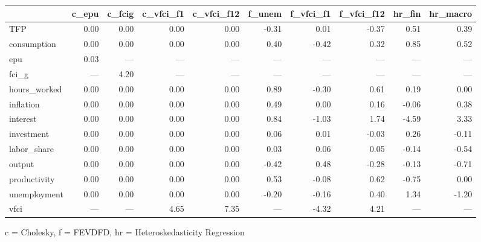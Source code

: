 
\fontsize{12.0pt}{14.4pt}\selectfont
\begin{tabular*}{\linewidth}{@{\extracolsep{\fill}}l|rrrrrrrrr}
\toprule
 & c\_epu & c\_fcig & c\_vfci\_f1 & c\_vfci\_f12 & f\_unem & f\_vfci\_f1 & f\_vfci\_f12 & hr\_fin & hr\_macro \\ 
\midrule\addlinespace[2.5pt]
TFP & 0.00 & 0.00 & 0.00 & 0.00 & -0.31 & 0.01 & -0.37 & 0.51 & 0.39 \\ 
consumption & 0.00 & 0.00 & 0.00 & 0.00 & 0.40 & -0.42 & 0.32 & 0.85 & 0.52 \\ 
epu & 0.03 & — & — & — & — & — & — & — & — \\ 
fci\_g & — & 4.20 & — & — & — & — & — & — & — \\ 
hours\_worked & 0.00 & 0.00 & 0.00 & 0.00 & 0.89 & -0.30 & 0.61 & 0.19 & 0.00 \\ 
inflation & 0.00 & 0.00 & 0.00 & 0.00 & 0.49 & 0.00 & 0.16 & -0.06 & 0.38 \\ 
interest & 0.00 & 0.00 & 0.00 & 0.00 & 0.84 & -1.03 & 1.74 & -4.59 & 3.33 \\ 
investment & 0.00 & 0.00 & 0.00 & 0.00 & 0.06 & 0.01 & -0.03 & 0.26 & -0.11 \\ 
labor\_share & 0.00 & 0.00 & 0.00 & 0.00 & 0.03 & 0.06 & 0.05 & -0.14 & -0.54 \\ 
output & 0.00 & 0.00 & 0.00 & 0.00 & -0.42 & 0.48 & -0.28 & -0.13 & -0.71 \\ 
productivity & 0.00 & 0.00 & 0.00 & 0.00 & 0.53 & -0.08 & 0.62 & -0.75 & 0.00 \\ 
unemployment & 0.00 & 0.00 & 0.00 & 0.00 & -0.20 & -0.16 & 0.40 & 1.34 & -1.20 \\ 
vfci & — & — & 4.65 & 7.35 & — & -4.32 & 4.21 & — & — \\ 
\bottomrule
\end{tabular*}
\begin{minipage}{\linewidth}
c = Cholesky, f = FEVDFD, hr = Heteroskedasticity Regression\\
\end{minipage}


